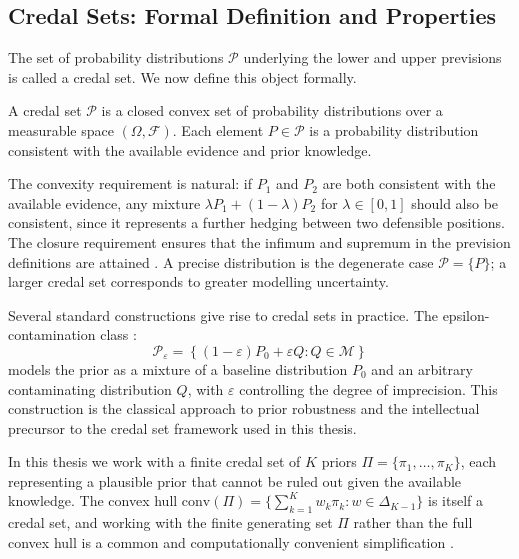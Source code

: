     \subsection{Credal Sets: Formal Definition and Properties}

    The set of probability distributions $\mathcal{P}$ underlying the lower and upper previsions is called a credal set. We now define this object formally.

    \begin{definition}
    A credal set $\mathcal{P}$ is a closed convex set of probability distributions over a measurable space $(\Omega, \mathcal{F})$. Each element $P \in \mathcal{P}$ is a probability distribution consistent with the available evidence and prior knowledge.
    \end{definition}

    The convexity requirement is natural: if $P_1$ and $P_2$ are both consistent with the available evidence, any mixture $\lambda P_1 + (1-\lambda) P_2$ for $\lambda \in [0,1]$ should also be consistent, since it represents a further hedging between two defensible positions. The closure requirement ensures that the infimum and supremum in the prevision definitions are attained \citep{augustin2014}. A precise distribution is the degenerate case $\mathcal{P} = \{P\}$; a larger credal set corresponds to greater modelling uncertainty.

    Several standard constructions give rise to credal sets in practice. The epsilon-contamination class \citep{berger1984}:
    \begin{equation}
        \mathcal{P}_\varepsilon = \left\{ (1-\varepsilon) P_0 + \varepsilon Q : Q \in \mathcal{M} \right\}
    \end{equation}
    models the prior as a mixture of a baseline distribution $P_0$ and an arbitrary contaminating distribution $Q$, with $\varepsilon$ controlling the degree of imprecision. This construction is the classical approach to prior robustness and the intellectual precursor to the credal set framework used in this thesis.

    In this thesis we work with a finite credal set of $K$ priors $\Pi = \{ \pi_1, \ldots, \pi_K \}$, each representing a plausible prior that cannot be ruled out given the available knowledge. The convex hull $\mathrm{conv}(\Pi) = \{ \sum_{k=1}^K w_k \pi_k : w \in \Delta_{K-1} \}$ is itself a credal set, and working with the finite generating set $\Pi$ rather than the full convex hull is a common and computationally convenient simplification \citep{cozman2000}.

